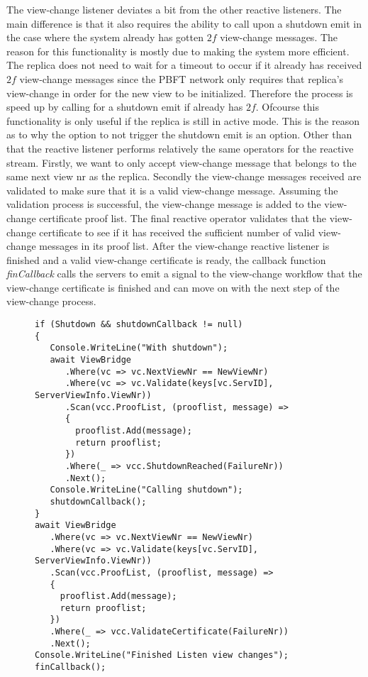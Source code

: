 The view-change listener deviates a bit from the other reactive listeners. The main difference is that it also requires the ability to call upon a shutdown emit in the case where the system already has gotten $2f$ view-change messages. The reason for this functionality is mostly due to making the system more efficient. The replica does not need to wait for a timeout to occur if it already has received $2f$ view-change messages since the PBFT network only requires that replica's view-change in order for the new view to be initialized. Therefore the process is speed up by calling for a shutdown emit if already has $2f$. Ofcourse this functionality is only useful if the replica is still in active mode. This is the reason as to why the option to not trigger the shutdown emit is an option. Other than that the reactive listener performs relatively the same operators for the reactive stream. Firstly, we want to only accept view-change message that belongs to the same next view nr as the replica. Secondly the view-change messages received are validated to make sure that it is a valid view-change message. Assuming the validation process is successful, the view-change message is added to the view-change certificate proof list. The final reactive operator validates that the view-change certificate to see if it has received the sufficient number of valid view-change messages in its proof list. After the view-change reactive listener is finished and a valid view-change certificate is ready, the callback function \emph{finCallback} calls the servers to emit a signal to the view-change workflow that the view-change certificate is finished and can move on with the next step of the view-change process. 

\begin{figure}[H]
	\centering
	\begin{lstlisting}[label = code:viewListener, caption=Handling timeout for the normal protocol workflow, captionpos = b, basicstyle=\scriptsize]
if (Shutdown && shutdownCallback != null)
{
   Console.WriteLine("With shutdown");
   await ViewBridge
      .Where(vc => vc.NextViewNr == NewViewNr)
      .Where(vc => vc.Validate(keys[vc.ServID], ServerViewInfo.ViewNr))
      .Scan(vcc.ProofList, (prooflist, message) =>
      {
        prooflist.Add(message);
        return prooflist;
      })
      .Where(_ => vcc.ShutdownReached(FailureNr))
      .Next();
   Console.WriteLine("Calling shutdown");
   shutdownCallback();
}
await ViewBridge
   .Where(vc => vc.NextViewNr == NewViewNr)
   .Where(vc => vc.Validate(keys[vc.ServID], ServerViewInfo.ViewNr))
   .Scan(vcc.ProofList, (prooflist, message) =>
   {
     prooflist.Add(message);
     return prooflist;
   })
   .Where(_ => vcc.ValidateCertificate(FailureNr))
   .Next();
Console.WriteLine("Finished Listen view changes");
finCallback();
    \end{lstlisting}
\end{figure} 

